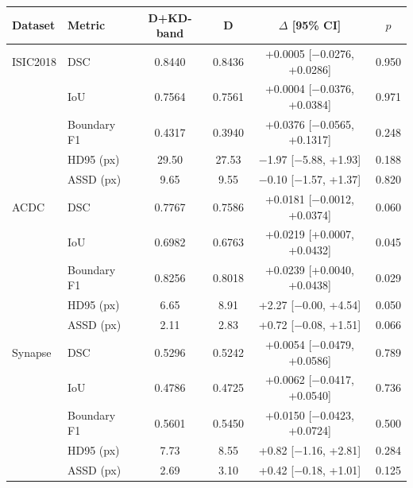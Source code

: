 \begin{tabular}{llcccc}
\toprule
Dataset & Metric & D+KD-band & D & $\Delta$ [95\% CI] & $p$ \\
\midrule
ISIC2018 & DSC & 0.8440 & 0.8436 & +0.0005 [$-$0.0276, +0.0286] & 0.950 \\
 & IoU & 0.7564 & 0.7561 & +0.0004 [$-$0.0376, +0.0384] & 0.971 \\
 & Boundary F1 & 0.4317 & 0.3940 & +0.0376 [$-$0.0565, +0.1317] & 0.248 \\
 & HD95 (px) & 29.50 & 27.53 & $-$1.97 [$-$5.88, +1.93] & 0.188 \\
 & ASSD (px) & 9.65 & 9.55 & $-$0.10 [$-$1.57, +1.37] & 0.820 \\
\addlinespace
ACDC & DSC & 0.7767 & 0.7586 & +0.0181 [$-$0.0012, +0.0374] & 0.060 \\
 & IoU & 0.6982 & 0.6763 & +0.0219 [+0.0007, +0.0432] & 0.045 \\
 & Boundary F1 & 0.8256 & 0.8018 & +0.0239 [+0.0040, +0.0438] & 0.029 \\
 & HD95 (px) & 6.65 & 8.91 & +2.27 [$-$0.00, +4.54] & 0.050 \\
 & ASSD (px) & 2.11 & 2.83 & +0.72 [$-$0.08, +1.51] & 0.066 \\
\addlinespace
Synapse & DSC & 0.5296 & 0.5242 & +0.0054 [$-$0.0479, +0.0586] & 0.789 \\
 & IoU & 0.4786 & 0.4725 & +0.0062 [$-$0.0417, +0.0540] & 0.736 \\
 & Boundary F1 & 0.5601 & 0.5450 & +0.0150 [$-$0.0423, +0.0724] & 0.500 \\
 & HD95 (px) & 7.73 & 8.55 & +0.82 [$-$1.16, +2.81] & 0.284 \\
 & ASSD (px) & 2.69 & 3.10 & +0.42 [$-$0.18, +1.01] & 0.125 \\
\bottomrule
\end{tabular}

